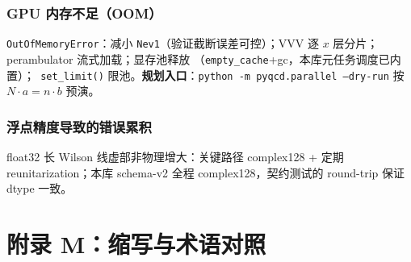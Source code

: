 \documentclass[11pt,a4paper]{ctexart}
\newcommand{\code}[1]{\texttt{#1}}
\begin{document}
\subsubsection{GPU 内存不足（OOM）}

\code{OutOfMemoryError}：减小 \code{Nev1}（验证截断误差可控）；VVV 逐
$x$ 层分片；perambulator 流式加载；显存池释放
（\code{empty\_cache}+gc，本库元任务调度已内置）；\code{
set\_limit()} 限池。\textbf{规划入口}：\code{python -m
pyqcd.parallel --dry-run} 按 $N\cdot a=n\cdot b$ 预演。

\subsubsection{浮点精度导致的错误累积}

float32 长 Wilson 线虚部非物理增大：关键路径 complex128 + 定期
reunitarization；本库 schema-v2 全程 complex128，契约测试的 round-trip
保证 dtype 一致。

\section{附录 M：缩写与术语对照}
\end{document}
